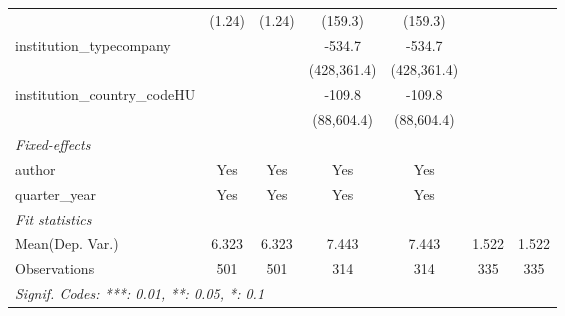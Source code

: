 \begin{tabular}{lcccccc}
                                      & (1.24)       & (1.24)       & (159.3)     & (159.3)     &     &   \\   
   institution\_typecompany           &              &              & -534.7      & -534.7      &     &   \\   
                                      &              &              & (428,361.4) & (428,361.4) &     &   \\   
   institution\_country\_codeHU       &              &              & -109.8      & -109.8      &     &   \\   
                                      &              &              & (88,604.4)  & (88,604.4)  &     &   \\   
   \midrule
   \emph{Fixed-effects}\\
   author                             & Yes          & Yes          & Yes         & Yes         &     & \\  
   quarter\_year                      & Yes          & Yes          & Yes         & Yes         &     & \\  
   \midrule
   \emph{Fit statistics}\\
Mean(Dep. Var.) & 6.323 & 6.323 & 7.443 & 7.443 & 1.522 & 1.522 \\
   Observations                       & 501          & 501          & 314         & 314         & 335 & 335\\  
   \midrule \midrule
   \multicolumn{7}{l}{\emph{Signif. Codes: ***: 0.01, **: 0.05, *: 0.1}}\\
\end{tabular}
\par\endgroup
